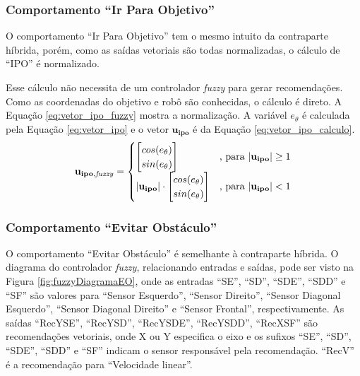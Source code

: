 	\subsubsection{Comportamento ``Ir Para Objetivo''}
	
	O comportamento ``Ir Para Objetivo'' tem o mesmo intuito da contraparte híbrida, porém, 
	como as saídas vetoriais são todas normalizadas, o cálculo de ``IPO'' é normalizado.
	
	Esse cálculo não necessita de um controlador \textit{fuzzy} para gerar recomendações. Como as 
	coordenadas do objetivo e robô são conhecidas, o cálculo é direto. A Equação 
	\ref{eq:vetor_ipo_fuzzy} mostra a normalização. A variável $e_\theta$ é calculada pela
	Equação \ref{eq:vetor_ipo} e o vetor $\mathbf{u_{ipo}}$ é da Equação 
	\ref{eq:vetor_ipo_calculo}.
	\begin{equation}
		\label{eq:vetor_ipo_fuzzy}
			\mathbf{u_{ipo,\mathit{fuzzy}}} = 
			\begin{cases}
				\mleft[
				\begin{matrix}
		  			cos(e_\theta) \\
		  			sin(e_\theta) \\
				\end{matrix}
				\mright] & \text{, para} \ | \mathbf{u_{ipo}} | \geq 1 \\
				| \mathbf{u_{ipo}} | \cdot \mleft[
				\begin{matrix}
		  			cos(e_\theta) \\
		  			sin(e_\theta) \\
				\end{matrix}
				\mright] & \text{, para} \ | \mathbf{u_{ipo}} | < 1 \\
			\end{cases}
	\end{equation}
	
	\subsubsection{Comportamento ``Evitar Obstáculo''}
	
	O comportamento ``Evitar Obstáculo'' é semelhante à contraparte híbrida. O diagrama do
	controlador \textit{fuzzy}, relacionando entradas e saídas, pode ser visto na Figura 
	\ref{fig:fuzzyDiagramaEO}, onde as entradas ``SE'', ``SD'', ``SDE'', ``SDD'' e ``SF'' são
	valores para ``Sensor Esquerdo'', ``Sensor Direito'', ``Sensor Diagonal Esquerdo'', 
	``Sensor Diagonal Direito'' e ``Sensor Frontal'', respectivamente. As saídas ``RecYSE'',
	``RecYSD'', ``RecYSDE'', ``RecYSDD'', ``RecXSF'' são recomendações vetoriais, onde X ou Y
	especifica o eixo e os sufixos ``SE'', ``SD'', ``SDE'', ``SDD'' e ``SF'' indicam o sensor
	responsável pela recomendação. ``RecV'' é a recomendação para ``Velocidade linear''.
	
